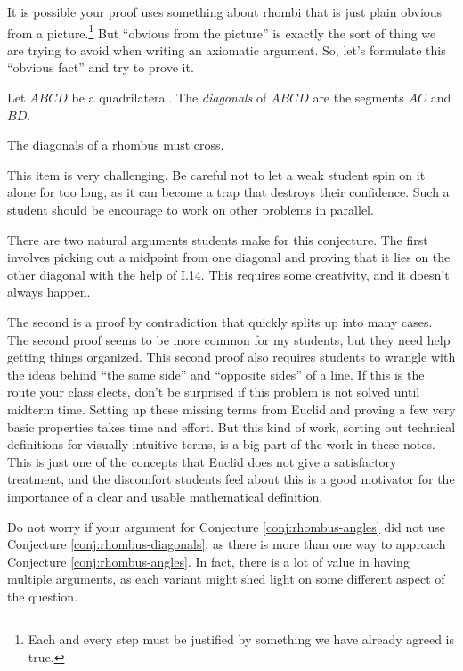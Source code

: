 It is possible your proof uses something about rhombi that is just plain obvious from a picture.\footnote{Each and every step must be justified by something we have already agreed is true.}
But ``obvious from the picture'' is exactly the sort of thing we are trying to avoid when writing an axiomatic argument.
So, let's formulate this ``obvious fact'' and try to prove it.


\begin{definition}\label{defn:diagonals}
Let $ABCD$ be a quadrilateral. The \emph{diagonals} of $ABCD$ are the segments $AC$ and $BD$.
\end{definition}

\begin{conjecture}\label{conj:rhombus-diagonals}
The diagonals of a rhombus must cross.
\end{conjecture}

\begin{annotation}
{
\color{blue}
This item is very challenging.
Be careful not to let a weak student spin on it alone for too long, as it can become a trap that destroys their confidence.
Such a student should be encourage to work on other problems in parallel.

There are two natural arguments students make for this conjecture.
The first involves picking out a midpoint from one diagonal and proving that it lies on the other diagonal with the help of I.14.
This requires some creativity, and it doesn't always happen.

The second is a proof by contradiction that quickly splits up into many cases.
The second proof seems to be more common for my students, but they need help getting things organized.
This second proof also requires students to wrangle with the ideas behind ``the same side'' and ``opposite sides'' of a line.
If this is the route your class elects, don't be surprised if this problem is not solved until midterm time.
Setting up these missing terms from Euclid and proving a few very basic properties takes time and effort. But this kind of work, sorting out technical definitions for visually intuitive terms, is a big part of the work in these notes. This is just one of the concepts that Euclid does not give a satisfactory treatment, and the discomfort students feel about this is a good motivator for the importance of a clear and usable mathematical definition.
}
\end{annotation}

Do not worry if your argument for Conjecture \ref{conj:rhombus-angles} did not use Conjecture \ref{conj:rhombus-diagonals}, as there is more than one way to approach Conjecture \ref{conj:rhombus-angles}.
In fact, there is a lot of value in having multiple arguments, as each variant might shed light on some different aspect of the question.

